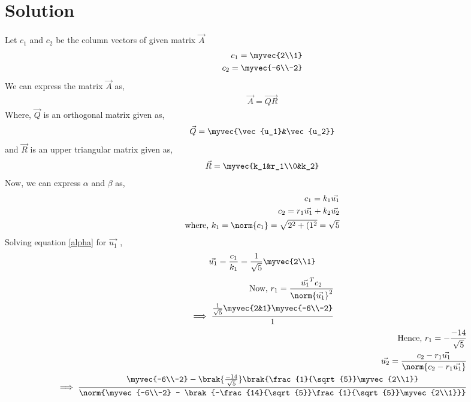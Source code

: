 \documentclass[journal,12pt,twocolumn]{IEEEtran}
\begin{document}
\section{Solution}
Let $c_1$ and $c_2$ be the column vectors of given matrix $\vec{A}$
\begin{align}
c_1 = \myvec{2\\1}\\
c_2 = \myvec{-6\\-2}
\end{align}
We can express the matrix $\vec{A}$ as,
\begin{align}
\vec{A}=\vec{QR}
\end{align}
Where, $\vec{Q}$ is an orthogonal matrix given as,
\begin{align}
\vec{Q} = \myvec{\vec{u_1}&\vec{u_2}}\label{orthogonal}
\end{align}
and $\vec{R}$ is an upper triangular matrix given as,
\begin{align}
\vec{R} = \myvec{k_1&r_1\\0&k_2}
\label{UT}
\end{align}
Now, we can express $\alpha$ and $\beta$ as,
\begin{align}
c_1 = k_1\vec{u_1}\label{alpha}\\
c_2 = r_1\vec{u_1} +k_2\vec{u_2}\label{beta}\\
\mbox{where, } k_1 = \norm{c_1} = \sqrt{2^2+(1^2} = \sqrt{5}\label{k1}
\end{align} 
Solving equation \eqref{alpha} for $\vec{u_1}$ ,
\begin{align}
\vec{u_1} = \frac{c_1}{k_1} = \frac{1}{\sqrt{5}}\myvec{2\\1}\label{u1}
\end{align}
\begin{align}
\mbox{Now, } r_1 = \frac{\vec{u_1}^Tc_2}{\norm{\vec{u_1}}^2}\\
\implies \frac{\frac{1}{\sqrt{5}}\myvec{2&1}\myvec{-6\\-2}}{1}
\end{align}
\begin{align}
\mbox{Hence, } r_1 = -\frac{-14}{\sqrt{5}}
\label{r1}\\
\vec{u_2} = \frac{c_2-r_1\vec{u_1}}{\norm{c_2-r_1\vec{u_1}}}\\
\implies \frac{\myvec{-6\\-2} - \brak{\frac{-14}{\sqrt{5}}}\brak{\frac{1}{\sqrt{5}}\myvec{2\\1}}}{\norm{\myvec{-6\\-2} - \brak{-\frac{14}{\sqrt{5}}\frac{1}{\sqrt{5}}\myvec{2\\1}}}} 
\end{align}
\end{document}
